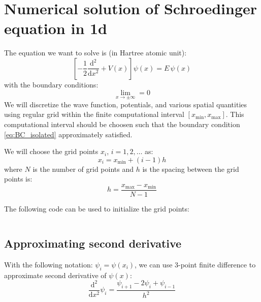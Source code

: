 \chapter{Numerical solution of Schroedinger equation in 1d}

The equation we want to solve is (in Hartree atomic unit):
\begin{equation}
\left[ -\frac{1}{2}\frac{\mathrm{d}^2}{\mathrm{d}x^2} + V(x) \right] \psi(x) = E\, \psi(x)
\end{equation}
with the boundary conditions:
\begin{equation}
\lim_{x \rightarrow \pm \infty} = 0
\label{eq:BC_isolated}
\end{equation}
%
We will discretize the wave function, potentials, and various spatial quantities using
regular grid within the finite computational interval
$\left[x_{\mathrm{min}}, x_{\mathrm{max}}\right]$. This computational interval should be choosen
such that the boundary condition \ref{eq:BC_isolated} approximately satisfied.

We will choose the grid points $x_{i}$, $i = 1, 2, \ldots$ as:
\begin{equation}
x_{i} = x_{\mathrm{min}} + (i-1)h
\end{equation}
where $N$ is the number of grid points and $h$ is the spacing between the grid points
is:
\begin{equation}
h = \frac{ x_{\mathrm{max}} - x_{\mathrm{min}} }{N-1}
\end{equation}

The following code can be used to initialize the grid points:

\inputminted[breaklines,fontsize=\scriptsize]{julia}{codes/1d/init_FD1d_grid.jl}


\section{Approximating second derivative}

With the following notation: $\psi_{i} = \psi(x_{i})$, we can use 3-point
finite difference to approximate second derivative of $\psi(x)$:
\begin{equation}
\frac{\mathrm{d}^2}{\mathrm{d}x^2} \psi_{i} =
\frac{\psi_{i+1} - 2\psi_{i} + \psi_{i-1}}{h^2}
\end{equation}


